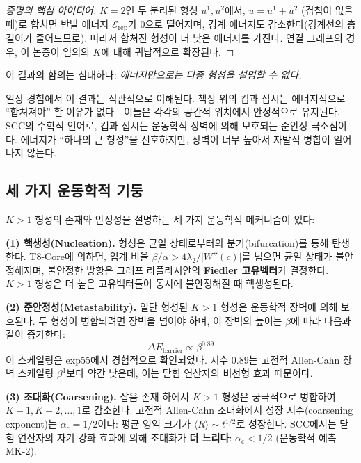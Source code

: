 \begin{proof}[증명의 핵심 아이디어]
$K = 2$인 두 분리된 형성 $u^1, u^2$에서, $u = u^1 + u^2$ (겹침이 없을 때)로 합치면 반발 에너지 $\mathcal{E}_{\mathrm{rep}}$가 0으로 떨어지며, 경계 에너지도 감소한다(경계선의 총 길이가 줄어드므로). 따라서 합쳐진 형성이 더 낮은 에너지를 가진다. 연결 그래프의 경우, 이 논증이 임의의 $K$에 대해 귀납적으로 확장된다.
\end{proof}

이 결과의 함의는 심대하다: \emph{에너지만으로는 다중 형성을 설명할 수 없다.}

\begin{remark}[인지적 유비]
일상 경험에서 이 결과는 직관적으로 이해된다. 책상 위의 컵과 접시는 에너지적으로 ``합쳐져야'' 할 이유가 없다---이들은 각각의 공간적 위치에서 안정적으로 유지된다. SCC의 수학적 언어로, 컵과 접시는 운동학적 장벽에 의해 보호되는 준안정 극소점이다. 에너지가 ``하나의 큰 형성''을 선호하지만, 장벽이 너무 높아서 자발적 병합이 일어나지 않는다.
\end{remark}

\subsection{세 가지 운동학적 기둥}

$K > 1$ 형성의 존재와 안정성을 설명하는 세 가지 운동학적 메커니즘이 있다:

\textbf{(1) 핵생성(Nucleation).} 형성은 균일 상태로부터의 분기(bifurcation)를 통해 탄생한다. T8-Core에 의하면, 임계 비율 $\beta/\alpha > 4\lambda_2/|W''(c)|$를 넘으면 균일 상태가 불안정해지며, 불안정한 방향은 그래프 라플라시안의 \textbf{Fiedler 고유벡터}가 결정한다. $K > 1$ 형성은 더 높은 고유벡터들이 동시에 불안정해질 때 핵생성된다.

\textbf{(2) 준안정성(Metastability).} 일단 형성된 $K > 1$ 형성은 운동학적 장벽에 의해 보호된다. 두 형성이 병합되려면 장벽을 넘어야 하며, 이 장벽의 높이는 $\beta$에 따라 다음과 같이 증가한다:
\begin{equation}
    \Delta E_{\mathrm{barrier}} \propto \beta^{0.89}
    \label{eq:barrier-scaling}
\end{equation}
이 스케일링은 exp55에서 경험적으로 확인되었다. 지수 $0.89$는 고전적 Allen-Cahn 장벽 스케일링 $\beta^1$보다 약간 낮은데, 이는 닫힘 연산자의 비선형 효과 때문이다.

\textbf{(3) 조대화(Coarsening).} 잡음 존재 하에서 $K > 1$ 형성은 궁극적으로 병합하여 $K-1, K-2, \ldots, 1$로 감소한다. 고전적 Allen-Cahn 조대화에서 성장 지수(coarsening exponent)는 $\alpha_c = 1/2$이다: 평균 영역 크기가 $\langle R \rangle \sim t^{1/2}$로 성장한다. SCC에서는 닫힘 연산자의 자기-강화 효과에 의해 조대화가 \textbf{더 느리다}: $\alpha_c < 1/2$ (운동학적 예측 MK-2).

